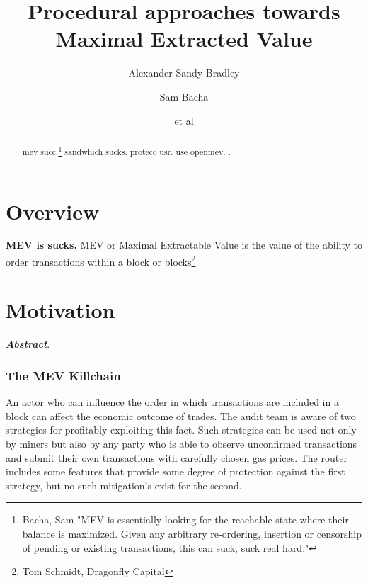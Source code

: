 \documentclass[runningheads]{llncs}
\begin{document}
\title{Procedural approaches towards Maximal Extracted Value}
%
\author{Alexander Sandy Bradley \and
	Sam Bacha \and
	et al}
%
%

\maketitle
\begin{abstract}

mev succ.\footnote{Bacha, Sam "MEV is essentially looking for the reachable state where their balance is maximized. Given any arbitrary re-ordering, insertion or censorship of pending or existing transactions, this can suck, suck real hard."}
sandwhich sucks.
protecc usr. 
use openmev. \cite{openmev}.

\end{abstract}


\section{Overview}
	\textbf{MEV is sucks. }\newline
 MEV or Maximal Extractable Value is the value of the ability to order transactions within a block or blocks\footnote{Tom Schmidt, Dragonfly Capital}
	\newline
\section{Motivation}
 \textbf{\emph{Abstract}}. 

\subsubsection{The MEV Killchain} 
An actor who can influence the order in which transactions are included in a block can affect the economic outcome of trades. The audit team is aware of two strategies for profitably exploiting this fact. Such strategies can be used not only by miners but also by any party who is able to observe unconfirmed transactions and submit their own transactions with carefully chosen gas prices. The router includes some features that provide some degree of protection against the first strategy, but no such mitigation's exist for the second.
\end{document}
